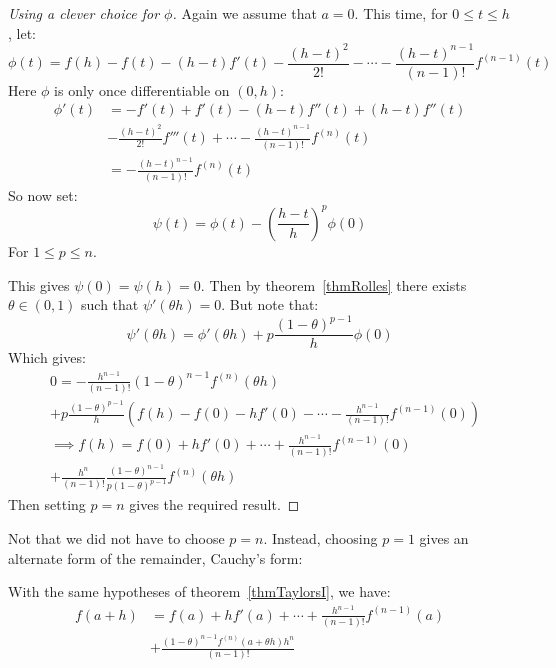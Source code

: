 \documentclass[../Main.tex]{subfiles}
\begin{document}
\begin{proof}[Using a clever choice for $\phi$]
    Again we assume that $a = 0$. This time, for $0 \leq t \leq h$, let:
    \begin{equation*}
        \phi(t) = f(h) - f(t) - (h - t)f'(t) - \frac{(h - t)^2}{2!} - \cdots - \frac{(h - t)^{n-1}}{(n-1)!} f^{(n-1)}(t)
    \end{equation*}
    Here $\phi$ is only once differentiable on $(0, h)$:
    \begin{align*}
        \phi'(t) &= -f'(t) + f'(t) - (h - t)f''(t) + (h - t)f''(t)\\
        &- \frac{(h - t)^2}{2!} f'''(t) + \cdots - \frac{(h - t)^{n - 1}}{(n-1)!} f^{(n)}(t) \\
        &= -\frac{(h-t)^{n-1}}{(n-1)!} f^{(n)}(t)
    \end{align*}
    So now set:
    \begin{equation*}
        \psi(t) = \phi(t) - \left(\frac{h - t}{h}\right)^p \phi(0)
    \end{equation*}
    For $1 \leq p \leq n$.\par
    This gives $\psi(0) = \psi(h) = 0$. Then by theorem~\ref{thmRolles} there exists $\theta \in (0, 1)$ such that $\psi'(\theta h) = 0$. But note that:
    \begin{equation*}
        \psi'(\theta h) = \phi'(\theta h) + p \frac{(1 - \theta)^{p-1}}{h} \phi(0)
    \end{equation*}
    Which gives:
    \begin{align*}
        &0 = - \frac{h^{n-1}}{(n-1)!}(1 - \theta)^{n-1} f^{(n)} (\theta h) \\
        &+ p \frac{(1 - \theta)^{p-1}}{h} \left(f(h) - f(0) - hf'(0) - \cdots - \frac{h^{n-1}}{(n-1)!}f^{(n-1)}(0)\right) \\
        &\implies f(h) = f(0) + hf'(0) + \cdots + \frac{h^{n-1}}{(n-1)!}f^{(n-1)}(0)\\
        &+ \frac{h^n}{(n-1)!} \frac{(1 - \theta)^{n-1}}{p(1-\theta)^{p-1}} f^{(n)} (\theta h)
    \end{align*}
    Then setting $p = n$ gives the required result.
\end{proof}
\begin{remark}
    Not that we did not have to choose $p = n$. Instead, choosing $p = 1$ gives an alternate form of the remainder, Cauchy's form:
\end{remark}
\begin{theorem}
    With the same hypotheses of theorem~\ref{thmTaylorsI}, we have:
    \begin{align*}
        f(a + h) &= f(a) + hf'(a) + \cdots + \frac{h^{n-1}}{(n-1)!} f^{(n-1)}(a) \\
        &+ \frac{(1 - \theta)^{n-1} f^{(n)} (a + \theta h) h^n}{(n - 1)!}
    \end{align*}
    \label{thmTaylorsII}
\end{theorem}
\end{document}
